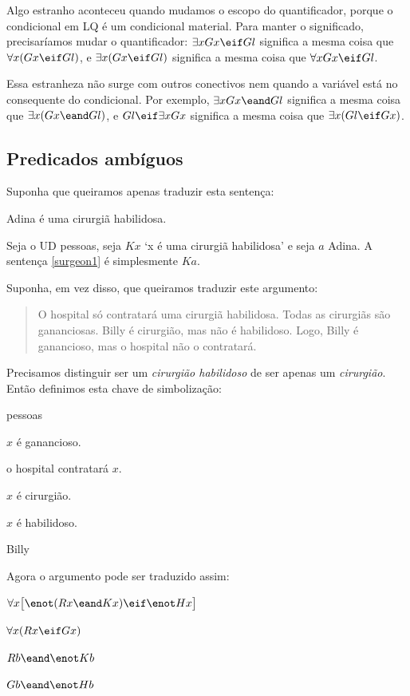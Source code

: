 Algo estranho aconteceu quando mudamos o escopo do quantificador, porque o condicional em LQ é um condicional material. Para manter o significado, precisaríamos mudar o quantificador: $\exists x Gx \eif Gl$ significa a mesma coisa que $\forall x (Gx \eif Gl)$, e $\exists x (Gx \eif Gl)$ significa a mesma coisa que $\forall x Gx \eif Gl$.

Essa estranheza não surge com outros conectivos nem quando a variável está no consequente do condicional. Por exemplo, $\exists x Gx \eand Gl$ significa a mesma coisa que $\exists x (Gx \eand Gl)$, e $Gl \eif \exists x Gx$ significa a mesma coisa que $\exists x(Gl \eif Gx)$.


\subsection{Predicados ambíguos}

Suponha que queiramos apenas traduzir esta sentença:
\begin{earg}
\item[\ex{surgeon1}] Adina é uma cirurgiã habilidosa.
\end{earg}
Seja o UD pessoas, seja $Kx$ `x é uma cirurgiã habilidosa' e seja $a$ Adina. A sentença \ref{surgeon1} é simplesmente $Ka$.

Suponha, em vez disso, que queiramos traduzir este argumento:
\begin{quote}
O hospital só contratará uma cirurgiã habilidosa. Todas as cirurgiãs são gananciosas. Billy é cirurgião, mas não é habilidoso. Logo, Billy é ganancioso, mas o hospital não o contratará.
\end{quote}
Precisamos distinguir ser um \emph{cirurgião habilidoso} de ser apenas um \emph{cirurgião}. Então definimos esta chave de simbolização:
\begin{ekey}
\item[UD:] pessoas
\item[Gx:] $x$ é ganancioso.
\item[Hx:] o hospital contratará $x$.
\item[Rx:] $x$ é cirurgião.
\item[Kx:] $x$ é habilidoso.
\item[b:] Billy
\end{ekey}

Agora o argumento pode ser traduzido assim:
\begin{earg}
\label{surgeon2}
\item[] $\forall x\bigl[\enot (Rx \eand Kx) \eif \enot Hx\bigr]$
\item[] $\forall x(Rx \eif Gx)$
\item[] $Rb \eand \enot Kb$
\item[\therefore] $Gb \eand \enot Hb$
\end{earg}

